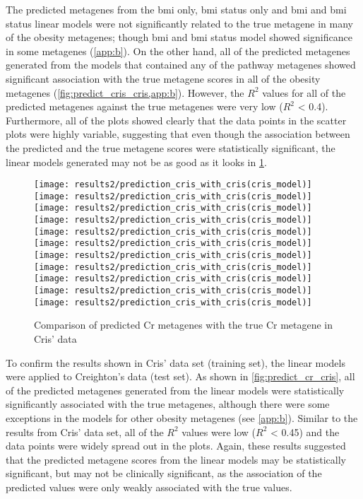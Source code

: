 The predicted metagenes from the \gls{bmi} only, \gls{bmi} status only and \gls{bmi} and \gls{bmi} status linear models were not significantly related to the true metagene in many of the obesity metagenes; though \gls{bmi} and \gls{bmi} status model showed significance in some metagenes (\cref{app:b}).
On the other hand, all of the predicted metagenes generated from the models that contained any of the pathway metagenes showed significant association with the true metagene scores in all of the obesity metagenes (\cref{fig:predict_cris_cris,app:b}).
However, the $R^2$ values for all of the predicted metagenes against the true metagenes were very low ($R^2$ \textless{} 0.4).
Furthermore, all of the plots showed clearly that the data points in the scatter plots were highly variable, suggesting that even though the association between the predicted and the true metagene scores were statistically significant, the linear models generated may not be as good as it looks in \cref{fig:predict_cris_cris}.

\begin{figure}[htpb]
	\centering
	\texttt{[image: results2/prediction\_cris\_with\_cris(cris\_model)]}
	\texttt{[image: results2/prediction\_cris\_with\_cris(cris\_model)]}
	\texttt{[image: results2/prediction\_cris\_with\_cris(cris\_model)]}
	\texttt{[image: results2/prediction\_cris\_with\_cris(cris\_model)]}
	\texttt{[image: results2/prediction\_cris\_with\_cris(cris\_model)]}
	\texttt{[image: results2/prediction\_cris\_with\_cris(cris\_model)]}
	\texttt{[image: results2/prediction\_cris\_with\_cris(cris\_model)]}
	\texttt{[image: results2/prediction\_cris\_with\_cris(cris\_model)]}
	\texttt{[image: results2/prediction\_cris\_with\_cris(cris\_model)]}
	\texttt{[image: results2/prediction\_cris\_with\_cris(cris\_model)]}
	\texttt{[image: results2/prediction\_cris\_with\_cris(cris\_model)]}
	\caption{Comparison of predicted Cr metagenes with the true Cr metagene in Cris' data}
	\label{fig:predict_cris_cris}
\end{figure}

To confirm the results shown in Cris' data set (training set), the linear models were applied to Creighton's data (test set).
As shown in \cref{fig:predict_cr_cris}, all of the predicted metagenes generated from the linear models were statistically significantly associated with the true metagenes, although there were some exceptions in the models for other obesity metagenes (see \cref{app:b}).
Similar to the results from Cris' data set, all of the $R^2$ values were low ($R^2$ \textless{} 0.45) and the data points were widely spread out in the plots.
Again, these results suggested that the predicted metagene scores from the linear models may be statistically significant, but may not be clinically significant, as the association of the predicted values were only weakly associated with the true values.
\\

